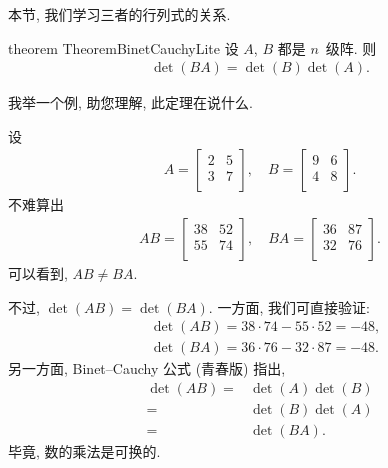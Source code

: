 \documentclass[%
    UTF8,%
    fontset=none,%
    punct=kaiming,%
    zihao=-4,%
    a4paper,%
    oneside,%
]{ctexbook}
\begin{document}
本节, 我们学习三者的行列式的关系.

\begin{restatable}{theorem}%
    {TheoremBinetCauchyLite}
    设 \(A\), \(B\) 都是 \(n\)~级阵.
    则
    \begin{align*}
        \det {(BA)} = \det {(B)} \det {(A)}.
    \end{align*}
\end{restatable}

我举一个例, 助您理解, 此定理在说什么.

\begin{example}
    设
    \begin{align*}
        A = \begin{bmatrix}
                2 & 5 \\
                3 & 7 \\
            \end{bmatrix},
        \quad
        B = \begin{bmatrix}
                9 & 6 \\
                4 & 8 \\
            \end{bmatrix}.
    \end{align*}
    不难算出
    \begin{align*}
        AB
        = \begin{bmatrix}
              38 & 52 \\
              55 & 74 \\
          \end{bmatrix},
        \quad
        BA
        = \begin{bmatrix}
              36 & 87 \\
              32 & 76 \\
          \end{bmatrix}.
    \end{align*}
    可以看到, \(AB \neq BA\).

    不过, \(\det {(AB)} = \det {(BA)}\).
    一方面, 我们可直接验证:
    \begin{align*}
         & \det {(AB)} = 38 \cdot 74 - 55 \cdot 52 = -48, \\
         & \det {(BA)} = 36 \cdot 76 - 32 \cdot 87 = -48.
    \end{align*}
    另一方面, Binet--Cauchy 公式 (青春版) 指出,
    \begin{align*}
        \det {(AB)}
        = {} & \det {(A)} \det {(B)} \\
        = {} & \det {(B)} \det {(A)} \\
        = {} & \det {(BA)}.
    \end{align*}
    毕竟, 数的乘法是可换的.
\end{example}
\end{document}
